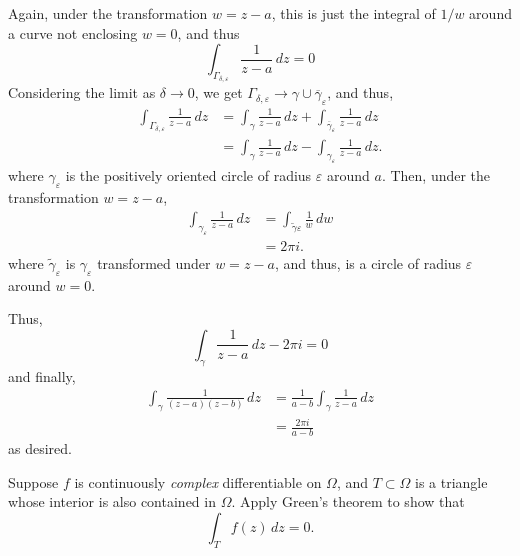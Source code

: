 \documentclass[12 pt, letterpaper]{hmcpset}
\begin{document}
\begin{solution}
\begin{enumerate}
			Again, under the transformation $w = z - a$, this is just the integral of $1/w$ around a curve not enclosing $w = 0$, and thus
			\[
				\int_{\Gamma_{\delta, \varepsilon}} \frac{1}{z - a} \, dz = 0
			\]
			Considering the limit as $\delta \to 0$, we get $\Gamma_{\delta, \varepsilon} \to \gamma \cup \overline{\gamma}_{\varepsilon}$, and thus,
			\[
				\begin{split}
					\int_{\Gamma_{\delta, \varepsilon}} \frac{1}{z - a} \, dz & = \int_{\gamma} \frac{1}{z - a} \, dz + \int_{\overline{\gamma}_{\varepsilon}} \frac{1}{z - a} \, dz \\
												  & = \int_{\gamma} \frac{1}{z - a} \, dz - \int_{\gamma_{\varepsilon}} \frac{1}{z - a} \, dz.
				\end{split}
			\]
			where $\gamma_{\varepsilon}$ is the positively oriented circle of radius $\varepsilon$ around $a$. Then, under the transformation $w = z - a$,
			\[
				\begin{split}
					\int_{\gamma_{\varepsilon}} \frac{1}{z - a} \, dz & = \int_{\tilde{\gamma}\varepsilon} \frac{1}{w} \, dw \\
											  & = 2 \pi i.
				\end{split} 
			\]
			where $\tilde{\gamma}_{\varepsilon}$ is $\gamma_{\varepsilon}$ transformed under $w = z - a$, and thus, is a circle of radius $\varepsilon$ around $w = 0$.

			Thus,
			\[
				\int_{\gamma} \frac{1}{z - a} \, dz - 2 \pi i = 0
			\]
			and finally,
			\[
				\begin{split}
					\int_{\gamma} \frac{1}{(z - a)(z - b)} \, dz & = \frac{1}{a - b} \int_{\gamma} \frac{1}{z - a} \, dz \\
										     & = \frac{2 \pi i}{a - b}
				\end{split} 
			\]
			as desired.
	\end{enumerate}
\end{solution}

\pagebreak

\begin{problem}[5.]
	Suppose $f$ is continuously \emph{complex} differentiable on $\Omega$, and $T \subset \Omega$ is a triangle whose interior is also contained in $\Omega$. Apply Green's theorem to show that
	\[
		\int_{T} f(z) \, dz = 0.
	\]
\end{problem}
\end{document}
